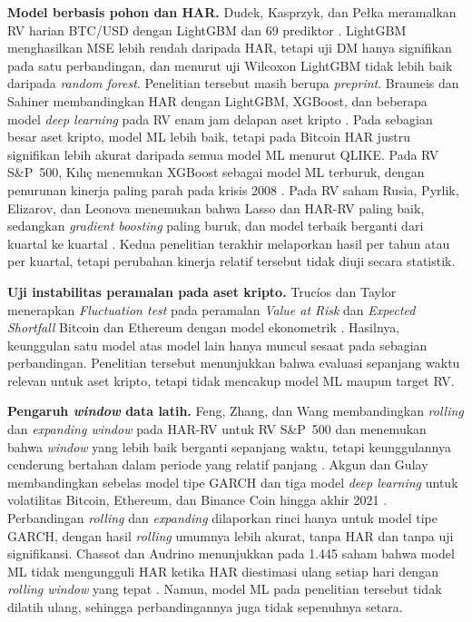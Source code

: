 \textbf{Model berbasis pohon dan HAR.} Dudek, Kasprzyk, dan Pełka meramalkan RV
harian BTC/USD dengan LightGBM dan 69 prediktor \cite{dudek2025lgbm}. LightGBM
menghasilkan MSE lebih rendah daripada HAR, tetapi uji DM hanya signifikan
pada satu perbandingan, dan menurut uji Wilcoxon LightGBM tidak lebih baik
daripada \textit{random forest}. Penelitian tersebut masih berupa
\textit{preprint}. Brauneis dan Sahiner membandingkan HAR dengan LightGBM,
XGBoost, dan beberapa model \textit{deep learning} pada RV enam jam delapan
aset kripto \cite{brauneis2026}. Pada sebagian besar aset kripto, model ML
lebih baik, tetapi pada Bitcoin HAR justru signifikan lebih akurat daripada
semua model ML menurut QLIKE. Pada RV S\&P~500, Kılıç menemukan XGBoost sebagai
model ML terburuk, dengan penurunan kinerja paling parah pada krisis 2008
\cite{kilic2025}. Pada RV saham Rusia, Pyrlik, Elizarov, dan Leonova menemukan
bahwa Lasso dan HAR-RV paling baik, sedangkan \textit{gradient boosting}
paling buruk, dan model terbaik berganti dari kuartal ke kuartal
\cite{pyrlik2021}. Kedua penelitian terakhir melaporkan hasil per tahun atau
per kuartal, tetapi perubahan kinerja relatif tersebut tidak diuji secara
statistik.

\textbf{Uji instabilitas peramalan pada aset kripto.} Trucíos dan Taylor
menerapkan \textit{Fluctuation test} pada peramalan \textit{Value at Risk} dan
\textit{Expected Shortfall} Bitcoin dan Ethereum dengan model ekonometrik
\cite{trucios2023}. Hasilnya, keunggulan satu model atas model lain hanya
muncul sesaat pada sebagian perbandingan. Penelitian tersebut menunjukkan bahwa evaluasi sepanjang waktu
relevan untuk aset kripto, tetapi tidak mencakup model ML maupun target RV.

\textbf{Pengaruh \textit{window} data latih.} Feng, Zhang, dan Wang
membandingkan \textit{rolling} dan \textit{expanding window} pada HAR-RV untuk
RV S\&P~500 dan menemukan bahwa \textit{window} yang lebih baik berganti
sepanjang waktu, tetapi keunggulannya cenderung bertahan dalam periode yang
relatif panjang \cite{feng2024window}. Akgun dan Gulay membandingkan sebelas
model tipe GARCH dan tiga model \textit{deep learning} untuk volatilitas
Bitcoin, Ethereum, dan Binance Coin hingga akhir 2021 \cite{akgun2025}.
Perbandingan \textit{rolling} dan \textit{expanding} dilaporkan rinci hanya
untuk model tipe GARCH, dengan hasil \textit{rolling} umumnya lebih akurat,
tanpa HAR dan tanpa uji signifikansi. Chassot dan Audrino menunjukkan pada
1.445 saham bahwa model ML tidak mengungguli HAR ketika HAR diestimasi ulang
setiap hari dengan \textit{rolling window} yang tepat \cite{chassot2026}.
Namun, model ML pada penelitian tersebut tidak dilatih ulang, sehingga
perbandingannya juga tidak sepenuhnya setara.


